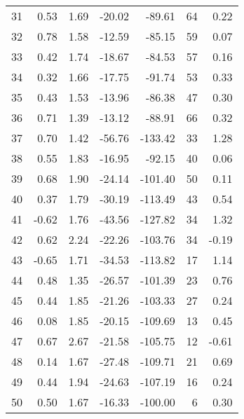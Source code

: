 \begin{appendices}
\begin{longtable}[c]{@{}rrrrrrr@{}}
31 & 0.53 & 1.69 & -20.02 & -89.61 & 64 & 0.22 \\

32 & 0.78 & 1.58 & -12.59 & -85.15 & 59 & 0.07 \\

33 & 0.42 & 1.74 & -18.67 & -84.53 & 57 & 0.16 \\

34 & 0.32 & 1.66 & -17.75 & -91.74 & 53 & 0.33 \\

35 & 0.43 & 1.53 & -13.96 & -86.38 & 47 & 0.30 \\

36 & 0.71 & 1.39 & -13.12 & -88.91 & 66 & 0.32 \\

37 & 0.70 & 1.42 & -56.76 & -133.42 & 33 & 1.28 \\

38 & 0.55 & 1.83 & -16.95 & -92.15 & 40 & 0.06 \\

39 & 0.68 & 1.90 & -24.14 & -101.40 & 50 & 0.11 \\

40 & 0.37 & 1.79 & -30.19 & -113.49 & 43 & 0.54 \\

41 & -0.62 & 1.76 & -43.56 & -127.82 & 34 & 1.32 \\

42 & 0.62 & 2.24 & -22.26 & -103.76 & 34 & -0.19 \\

43 & -0.65 & 1.71 & -34.53 & -113.82 & 17 & 1.14 \\

44 & 0.48 & 1.35 & -26.57 & -101.39 & 23 & 0.76 \\

45 & 0.44 & 1.85 & -21.26 & -103.33 & 27 & 0.24 \\

46 & 0.08 & 1.85 & -20.15 & -109.69 & 13 & 0.45 \\

47 & 0.67 & 2.67 & -21.58 & -105.75 & 12 & -0.61 \\

48 & 0.14 & 1.67 & -27.48 & -109.71 & 21 & 0.69 \\

49 & 0.44 & 1.94 & -24.63 & -107.19 & 16 & 0.24 \\

50 & 0.50 & 1.67 & -16.33 & -100.00 & 6 & 0.30 \\


\end{longtable}
\end{appendices}
